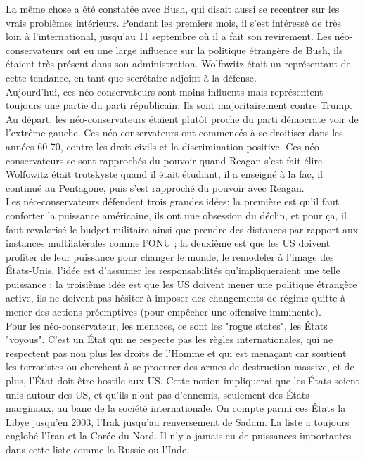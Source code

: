 \documentclass[10pt, a4paper, openany]{book}
\begin{document}
La même chose a été constatée avec Bush, qui disait aussi se recentrer sur les vrais problèmes intérieurs. Pendant les premiers mois, il s'est intéressé de très loin à l'international, jusqu'au 11 septembre où il a fait son revirement. Les néo-conservateurs ont eu une large influence sur la politique étrangère de Bush, ils étaient très présent dans son administration. Wolfowitz était un représentant de cette tendance, en tant que secrétaire adjoint à la défense. \\
Aujourd'hui, ces néo-conservateurs sont moins influents mais représentent toujours une partie du parti républicain. Ils sont majoritairement contre Trump. \\
Au départ, les néo-conservateurs étaient plutôt proche du parti démocrate voir de l'extrême gauche. Ces néo-conservateurs ont commencés à se droitiser dans les années 60-70, contre les droit civils et la discrimination positive. Ces néo-conservateurs se sont rapprochés du pouvoir quand Reagan s'est fait élire. Wolfowitz était trotskyste quand il était étudiant, il a enseigné à la fac, il continué au Pentagone, puis s'est rapproché du pouvoir avec Reagan. \\
Les néo-conservateurs défendent trois grandes idées: la première est qu'il faut conforter la puissance américaine, ils ont une obsession du déclin, et pour ça, il faut revalorisé le budget militaire ainsi que prendre des distances par rapport aux instances multilatérales comme l'ONU ; la deuxième est que les US doivent profiter de leur puissance pour changer le monde, le remodeler à l'image des États-Unis, l'idée est d'assumer les responsabilités qu'impliqueraient une telle puissance ; la troisième idée est que les US doivent mener une politique étrangère active, ils ne doivent pas hésiter à imposer des changements de régime quitte à mener des actions préemptives (pour empêcher une offensive imminente). \\
Pour les néo-conservateur, les menaces, ce sont les "rogue states", les États "voyous". C'est un État qui ne respecte pas les règles internationales, qui ne respectent pas non plus les droits de l'Homme et qui est menaçant car soutient les terroristes ou cherchent à se procurer des armes de destruction massive, et de plus, l'État doit être hostile aux US. Cette notion impliquerai que les États soient unis autour des US, et qu'ils n'ont pas d'ennemis, seulement des États marginaux, au banc de la société internationale. On compte parmi ces États la Libye jusqu'en 2003, l'Irak jusqu'au renversement de Sadam. La liste a toujours englobé l'Iran et la Corée du Nord. Il n'y a jamais eu de puissances importantes dans cette liste comme la Russie ou l'Inde. 
\end{document}
